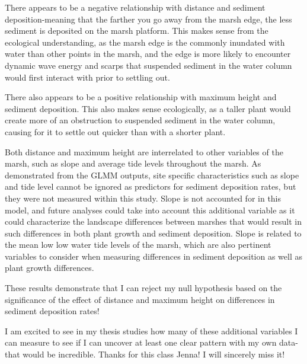 \documentclass[
]{article}
\begin{document}
There appears to be a negative relationship with distance and sediment
deposition-meaning that the farther you go away from the marsh edge, the
less sediment is deposited on the marsh platform. This makes sense from
the ecological understanding, as the marsh edge is the commonly
inundated with water than other points in the marsh, and the edge is
more likely to encounter dynamic wave energy and scarps that suspended
sediment in the water column would first interact with prior to settling
out.

There also appears to be a positive relationship with maximum height and
sediment deposition. This also makes sense ecologically, as a taller
plant would create more of an obstruction to suspended sediment in the
water column, causing for it to settle out quicker than with a shorter
plant.

Both distance and maximum height are interrelated to other variables of
the marsh, such as slope and average tide levels throughout the marsh.
As demonstrated from the GLMM outputs, site specific characteristics
such as slope and tide level cannot be ignored as predictors for
sediment deposition rates, but they were not measured within this study.
Slope is not accounted for in this model, and future analyses could take
into account this additional variable as it could characterize the
landscape differences between marshes that would result in such
differences in both plant growth and sediment deposition. Slope is
related to the mean low low water tide levels of the marsh, which are
also pertinent variables to consider when measuring differences in
sediment deposition as well as plant growth differences.

These results demonstrate that I can reject my null hypothesis based on
the significance of the effect of distance and maximum height on
differences in sediment deposition rates!

I am excited to see in my thesis studies how many of these additional
variables I can measure to see if I can uncover at least one clear
pattern with my own data-that would be incredible. Thanks for this class
Jenna! I will sincerely miss it!
\end{document}
